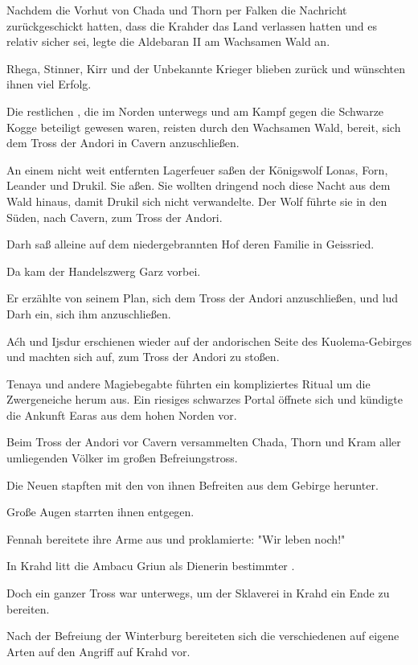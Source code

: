 
Nachdem die Vorhut von Chada und Thorn per Falken die Nachricht zurückgeschickt hatten, dass die Krahder das Land verlassen hatten und es relativ sicher sei, legte die Aldebaran II am Wachsamen Wald an. 

Rhega, Stinner, Kirr und der Unbekannte Krieger blieben zurück und wünschten ihnen viel Erfolg.

Die restlichen , die im Norden unterwegs und am Kampf gegen die Schwarze Kogge beteiligt gewesen waren, reisten durch den Wachsamen Wald, bereit, sich dem Tross der Andori in Cavern anzuschließen.

\trennzeichen

An einem nicht weit entfernten Lagerfeuer saßen der Königswolf Lonas, Forn, Leander und Drukil. Sie aßen. Sie wollten dringend noch diese Nacht aus dem Wald hinaus, damit Drukil sich nicht verwandelte. Der Wolf führte sie in den Süden, nach Cavern, zum Tross der Andori.

\trennzeichen

Darh saß alleine auf dem niedergebrannten Hof deren Familie in Geissried. 

Da kam der Handelszwerg Garz vorbei. 

Er erzählte von seinem Plan, sich dem Tross der Andori anzuschließen, und lud Darh ein, sich ihm anzuschließen.

\trennzeichen

Aćh und Ijsdur erschienen wieder auf der andorischen Seite des Kuolema-Gebirges und machten sich auf, zum Tross der Andori zu stoßen.

\trennzeichen

Tenaya und andere Magiebegabte führten ein kompliziertes Ritual um die Zwergeneiche herum aus. Ein riesiges schwarzes Portal öffnete sich und kündigte die Ankunft Earas aus dem hohen Norden vor.

\trennzeichen

Beim Tross der Andori vor Cavern versammelten Chada, Thorn und Kram  aller umliegenden Völker im großen Befreiungstross.

Die Neuen  stapften mit den von ihnen Befreiten aus dem Gebirge herunter. 

Große Augen starrten ihnen entgegen.

Fennah bereitete ihre Arme aus und proklamierte: "Wir leben noch!"




In Krahd litt die Ambacu Griun als Dienerin bestimmter .

\trennzeichen

Doch ein ganzer Tross war unterwegs, um der Sklaverei in Krahd ein Ende zu bereiten.

Nach der Befreiung der Winterburg bereiteten sich die verschiedenen  auf eigene Arten auf den Angriff auf Krahd vor.

